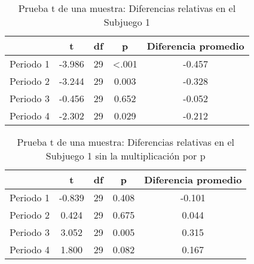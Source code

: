 \begin{table}[h]
\caption[Prueba t de una muestra: Diferencias relativas en el Subjuego 1]{Prueba t de una muestra: Diferencias relativas en el Subjuego 1}
\label{DN-S1}
\centering
\begin{tabular}{l | c c c | c}
\toprule
\textbf{} & \textbf{t} & \textbf{df} & \textbf{p} & \textbf{Diferencia promedio}\\
\midrule
Periodo 1 & -3.986 & 29 & <.001 & -0.457\\
Periodo 2 & -3.244 & 29 & 0.003 & -0.328\\
Periodo 3 & -0.456 & 29 & 0.652 & -0.052\\
Periodo 4 & -2.302 & 29 & 0.029 & -0.212\\
\bottomrule
\end{tabular}
\end{table}










\begin{table}[h]
\caption[Prueba t de una muestra: Diferencias relativas en el Subjuego 1 sin la multiplicación por p]{Prueba t de una muestra: Diferencias relativas en el Subjuego 1 sin la multiplicación por p}
\label{DN-S1}
\centering
\begin{tabular}{l | c c c | c}
\toprule
\textbf{} & \textbf{t} & \textbf{df} & \textbf{p} & \textbf{Diferencia promedio}\\
\midrule
Periodo 1 & -0.839 & 29 & 0.408 & -0.101\\
Periodo 2 & 0.424 & 29 & 0.675 & 0.044\\
Periodo 3 & 3.052 & 29 & 0.005 & 0.315\\
Periodo 4 & 1.800 & 29 & 0.082 & 0.167\\
\bottomrule
\end{tabular}
\end{table}









